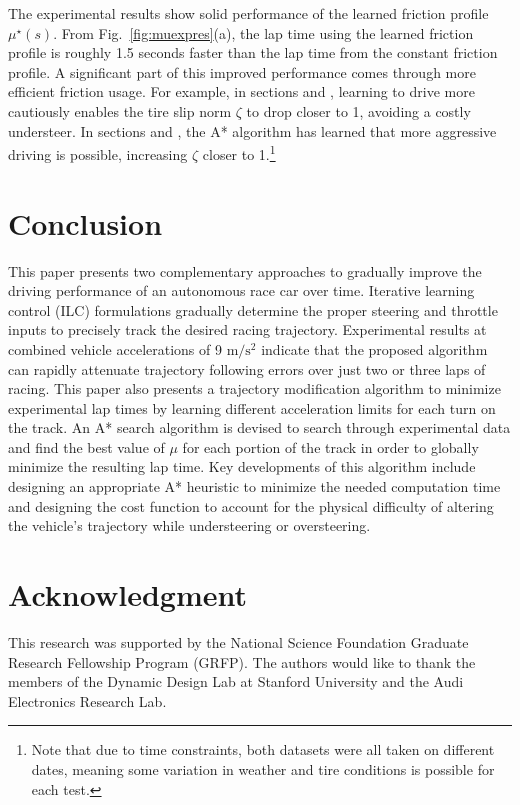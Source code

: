 \documentclass[9pt,shortpaper,twoside,web]{ieeecolor}
\newcommand*\circled[1]{\tikz[baseline=(char.base)]{
            \node[shape=circle,draw,inner sep=2pt] (char) {#1};}}
\begin{document}
 The experimental results show solid performance of the learned friction profile $\mu^\star(s)$. From Fig.~\ref{fig:muexpres}(a), the lap time using the learned friction profile is roughly 1.5 seconds faster than the lap time from the constant friction profile. A significant part of this improved performance comes through more efficient friction usage.
 For example, in sections \circled{2} and \circled{8}, learning to drive more cautiously enables the tire slip norm $\zeta$ to drop closer to 1, avoiding
 a costly understeer. In sections \circled{3} and \circled{7}, the A* algorithm has learned that more aggressive driving is possible, increasing $\zeta$ closer to 1.\footnote{Note that due to time constraints, both datasets were all taken on different dates, meaning some variation in weather and tire conditions is possible for each test.} 

\section{Conclusion}
This paper presents two complementary approaches to gradually improve the driving performance of an autonomous race car 
over time. Iterative learning control (ILC) formulations gradually determine the proper steering and throttle inputs to precisely track the desired racing trajectory. Experimental results at combined vehicle accelerations of 9 $\mathrm{m/s^2}$  indicate that the proposed algorithm can rapidly attenuate trajectory following errors over just two or three laps of racing. This paper also presents a trajectory modification algorithm to minimize experimental lap times by learning different acceleration limits for each turn on the track. An A* search algorithm is devised to search through experimental data and find the best value of $\mu$ for each portion of the track in order to globally minimize the resulting lap time. Key developments of this algorithm include designing an appropriate A* heuristic to minimize the needed computation time and designing the cost function to account for the physical difficulty of altering the vehicle's trajectory while understeering or oversteering.

\section*{Acknowledgment}

This research was supported by the National Science Foundation Graduate Research Fellowship Program (GRFP). The
authors would like to thank the members of the Dynamic
Design Lab at Stanford University and the Audi Electronics
Research Lab.



\end{document}
